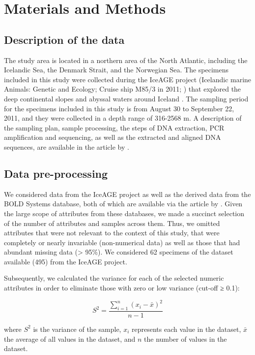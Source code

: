 \section{Materials and Methods}\label{materials-methods}

\subsection{Description of the data}
The study area is located in a northern area of the North Atlantic, including the Icelandic Sea, the Denmark Strait, and the Norwegian Sea. The specimens included in this study were collected during the IceAGE project (Icelandic marine Animals: Genetic and Ecology; Cruise ship M85/3 in 2011; \citep{brix_iceage_2014}) that explored the deep continental slopes and abyssal waters around Iceland \citep{meisner_prefacebiodiversity_2018}. The sampling period for the specimens included in this study is from August 30 to September 22, 2011, and they were collected in a depth range of 316-2568 m. A description of the sampling plan, sample processing, the steps of DNA extraction, PCR amplification and sequencing, as well as the extracted and aligned DNA sequences, are available in the article by \citep{uhlir_adding_2021}.

\subsection{Data pre-processing}
We considered data from the IceAGE project as well as the derived data from the BOLD Systems database, both of which are available via the article by \citep{uhlir_adding_2021}. Given the large scope of attributes from these databases, we made a succinct selection of the number of attributes and samples across them. Thus, we omitted attributes that were not relevant to the context of this study, that were completely or nearly invariable (non-numerical data) as well as those that had abundant missing data (> 95\%). We considered 62 specimens of the dataset available (495) from the IceAGE project.

Subsequently, we calculated the variance for each of the selected numeric attributes in order to eliminate those with zero or low variance (cut-off ≥ 0.1):

\begin{equation}
S^2 = \frac{\sum_{i=1}^{n} (x_i - \bar{x})^2}{n-1}
\end{equation}

where \( S^2 \) is the variance of the sample, \( x_i \) represents each value in the dataset, \( \bar{x} \) the average of all values in the dataset, and \( n \) the number of values in the dataset.

